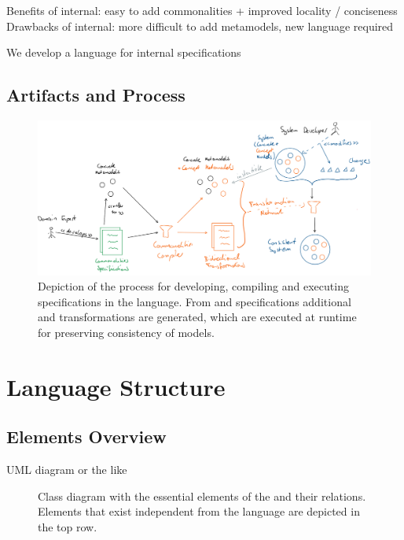 Benefits of internal: easy to add commonalities + improved locality / conciseness
Drawbacks of internal: more difficult to add metamodels, new language required

We develop a language for internal specifications


\subsection{Artifacts and Process}

\begin{figure}
    \centering
    \includegraphics[width=\textwidth]{figures/quality/language/overall_process.png}
    \caption[Process and artifacts using the \commonalities language]{Depiction of the process for developing, compiling and executing specifications in the \commonalities language. From \concretemetamodels and \commonalities specifications additional \conceptmetamodels and transformations are generated, which are executed at runtime for preserving consistency of models.}
    \label{fig:language:process}
\end{figure}


\section{Language Structure}

\subsection{Elements Overview}
UML diagram or the like

\begin{figure}
    \centering
    
    \caption[\commonalitieslanguage elements]{Class diagram with the essential elements of the \commonalitieslanguage and their relations. Elements that exist independent from the language are depicted in the top row.}
    \label{fig:language:elements}
\end{figure}

